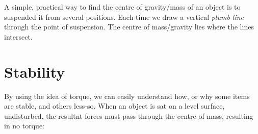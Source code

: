 A simple, practical way to find the centre of gravity/mass of an object is to suspended it from several positions. Each time we draw a vertical \emph{plumb-line} through the point of suspension. The centre of mass/gravity lies where the lines intersect.
\section{Stability}

By using the idea of torque, we can easily understand how, or why some items are stable, and others less-so. When an object is sat on a level surface, undisturbed, the resultnt forces must pass through the centre of mass, resulting in no torque:
\def\H{3.1} %
\def\W{1.4} %
\def\R{sqrt(\W^2+\H^2)/2} %
\def\D{0.25} %
\def\ang{atan(\H/\W)} %
\def\angcw{atan2(\H,-\W)} %

